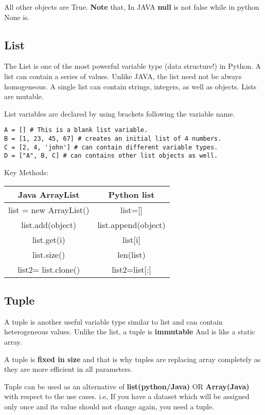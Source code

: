 \documentclass[a4paper,9pt]{extarticle}
\begin{document}
\begin{multicols*}{2}
All other objects are True.
\textbf{Note} that, In JAVA \textbf{null} is not false while in python None is.\subsection{List}
The List is one of the most powerful variable type (data structure!) in Python. A list can contain a series of values. Unlike JAVA, the list need not be always homogeneous. A single list can contain strings, integers, as well as objects. Lists are mutable.

List variables are declared by using brackets \boxed{[ ]} following the variable name.

\begin{lstlisting}
A = [] # This is a blank list variable.
B = [1, 23, 45, 67] # creates an initial list of 4 numbers.
C = [2, 4, 'john'] # can contain different variable types.
D = ["A", B, C] # can contains other list objects as well.
\end{lstlisting}

Key Methods:
\begin{center}
 \begin{tabular}{||c | c||}
 \hline
 Java ArrayList & Python list\\ [1ex]
 \hline\hline
 list = new ArrayList() & list=[]\\
 \hline
 list.add(object) & list.append(object)\\
 \hline
 list.get(i) & list[i]\\
 \hline
 list.size() & len(list)\\
 \hline
 list2= list.clone() & list2=list[:]\\
 \hline
\end{tabular}
\end{center}

\subsection{Tuple}
A tuple is another useful variable type similar to list and can contain heterogeneous values. Unlike the list, a tuple is \textbf{immutable} And is like a static array.

A tuple is \textbf{fixed in size} and that is why tuples are replacing array completely as they are more efficient in all parameters.

Tuple can be used as an alternative of \textbf{list(python/Java)} OR \textbf{Array(Java)} with respect to the use cases. i.e, If you have a dataset which will be assigned only once and its value should not change again, you need a tuple.


\end{multicols*}
\end{document}
